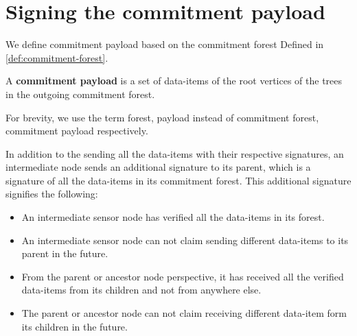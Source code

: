 	\section{Signing the commitment payload}
		We define commitment payload based on the commitment forest Defined in \ref{def:commitment-forest}.
	\begin{definition}
		A \textbf{commitment payload} is a set of data-items of the root vertices of the trees in the outgoing commitment forest.
	\end{definition}
	For brevity, we use the term forest, payload instead of commitment forest, commitment payload respectively.

	In addition to the sending all the data-items with their respective signatures, an intermediate node sends an additional signature to its parent, which is a signature of all the data-items in its commitment forest.
	This additional signature signifies the following:
	\begin{itemize}
		\item	An intermediate sensor node has verified all the data-items in its forest.
		\item An intermediate sensor node can not claim sending different data-items to its parent in the future.
		\item From the parent or ancestor node perspective, it has received all the verified data-items from its children and not from anywhere else.
		\item The parent or ancestor node can not claim receiving different data-item form its children in the future.
	\end{itemize}
		
